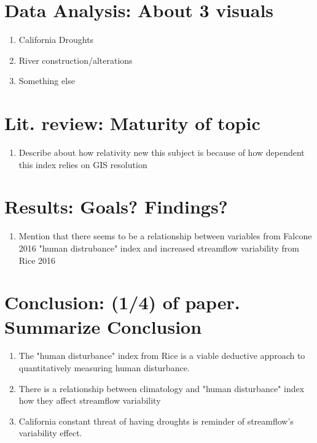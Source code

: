 \documentclass{article}
\begin{document}
\section{Data Analysis: About 3 visuals}

    \begin{enumerate}
        \item California Droughts
        \item River construction/alterations
        \item Something else
    \end{enumerate}

\section{Lit. review: Maturity of topic}

    \begin{enumerate}
        \item Describe about how relativity new this subject is because of how dependent this index relies on GIS resolution
    \end{enumerate}

\section{Results: Goals? Findings?}

    \begin{enumerate}
        \item Mention that there seems to be a relationship between variables from Falcone 2016 "human distrubance" index and increased streamflow variability from Rice 2016
    \end{enumerate}

\section{Conclusion: (1/4) of paper. Summarize Conclusion}


    \begin{enumerate}
        \item The "human disturbance" index from Rice is a viable deductive approach to quantitatively measuring human disturbance. 
        \item There is a relationship  between climatology and "human disturbance" index how they affect streamflow variability 
        \item California constant threat of having droughts is reminder of streamflow's variability effect.
    \end{enumerate}
\end{document}
